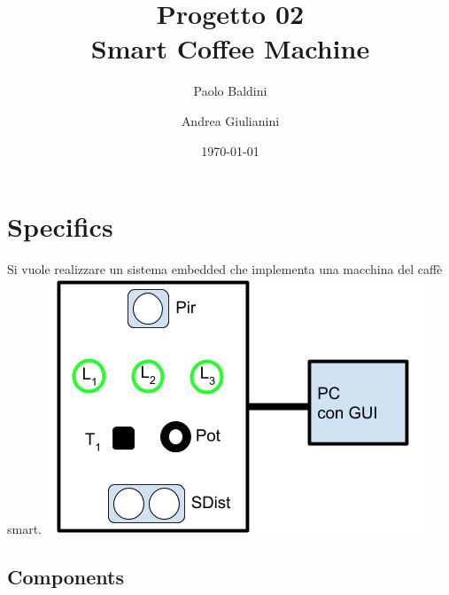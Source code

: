 \documentclass{article}
\title{Progetto 02 \\ Smart Coffee Machine} %
\author{Paolo Baldini \and Andrea Giulianini} %
\date{\today} %
\begin{document}
\maketitle %



\section{Specifics}

Si vuole realizzare un sistema embedded che implementa una macchina del caffè smart.
\newline\newline
\includegraphics[scale=0.55,center]{res/img/scm.png}


\subsection{Components}
\end{document}
